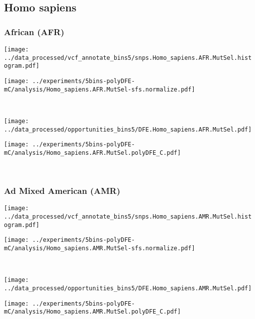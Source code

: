 \subsection{Homo sapiens}

\subsubsection{African (AFR)}

\begin{minipage}{0.49\linewidth}
    \texttt{[image: ../data\_processed/vcf\_annotate\_bins5/snps.Homo\_sapiens.AFR.MutSel.histogram.pdf]}
\end{minipage}
\begin{minipage}{0.49\linewidth}
    \texttt{[image: ../experiments/5bins-polyDFE-mC/analysis/Homo\_sapiens.AFR.MutSel-sfs.normalize.pdf]}
\end{minipage}
\\
\begin{minipage}{0.49\linewidth}
    \texttt{[image: ../data\_processed/opportunities\_bins5/DFE.Homo\_sapiens.AFR.MutSel.pdf]}
\end{minipage}
\begin{minipage}{0.49\linewidth}
    \texttt{[image: ../experiments/5bins-polyDFE-mC/analysis/Homo\_sapiens.AFR.MutSel.polyDFE\_C.pdf]}
\end{minipage}
\\

\subsubsection{Ad Mixed American (AMR)}

\begin{minipage}{0.49\linewidth}
    \texttt{[image: ../data\_processed/vcf\_annotate\_bins5/snps.Homo\_sapiens.AMR.MutSel.histogram.pdf]}
\end{minipage}
\begin{minipage}{0.49\linewidth}
    \texttt{[image: ../experiments/5bins-polyDFE-mC/analysis/Homo\_sapiens.AMR.MutSel-sfs.normalize.pdf]}
\end{minipage}
\\
\begin{minipage}{0.49\linewidth}
    \texttt{[image: ../data\_processed/opportunities\_bins5/DFE.Homo\_sapiens.AMR.MutSel.pdf]}
\end{minipage}
\begin{minipage}{0.49\linewidth}
    \texttt{[image: ../experiments/5bins-polyDFE-mC/analysis/Homo\_sapiens.AMR.MutSel.polyDFE\_C.pdf]}
\end{minipage}
\\

